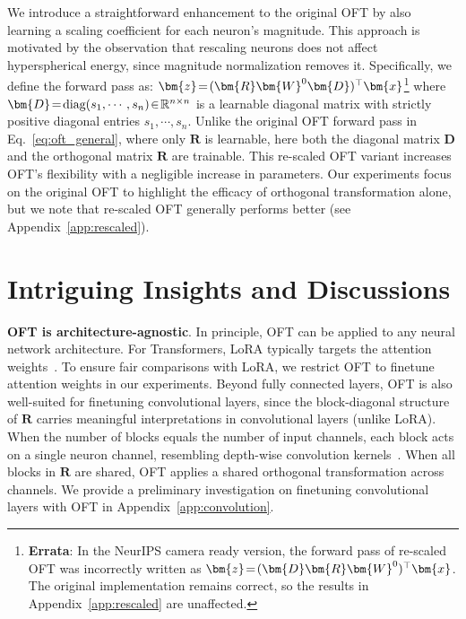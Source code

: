 We introduce a straightforward enhancement to the original OFT by also learning a scaling coefficient for each neuron’s magnitude. This approach is motivated by the observation that rescaling neurons does not affect hyperspherical energy, since magnitude normalization removes it. Specifically, we define the forward pass as: $\thickmuskip=2mu \medmuskip=2mu\bm{z}=(\bm{R}\bm{W}^0\bm{D})^\top\bm{x}$\footnote{\textbf{Errata}: In the NeurIPS camera ready version, the forward pass of re-scaled OFT was incorrectly written as $\thickmuskip=2mu \medmuskip=2mu\bm{z}=(\bm{D}\bm{R}\bm{W}^0)^\top\bm{x}$. The original implementation remains correct, so the results in Appendix~\ref{app:rescaled} are unaffected.} where $\thickmuskip=2mu \medmuskip=2mu \bm{D}=\text{diag}(s_1,\cdots,s_n)\in\mathbb{R}^{n\times n}$ is a learnable diagonal matrix with strictly positive diagonal entries $s_1,\cdots,s_n$. Unlike the original OFT forward pass in Eq.~\eqref{eq:oft_general}, where only $\bm{R}$ is learnable, here both the diagonal matrix $\bm{D}$ and the orthogonal matrix $\bm{R}$ are trainable. This re-scaled OFT variant increases OFT’s flexibility with a negligible increase in parameters. Our experiments focus on the original OFT to highlight the efficacy of orthogonal transformation alone, but we note that re-scaled OFT generally performs better (see Appendix~\ref{app:rescaled}).

\section{Intriguing Insights and Discussions}

\textbf{OFT is architecture-agnostic}. In principle, OFT can be applied to any neural network architecture. For Transformers, LoRA typically targets the attention weights~\cite{hulora2022}. To ensure fair comparisons with LoRA, we restrict OFT to finetune attention weights in our experiments. Beyond fully connected layers, OFT is also well-suited for finetuning convolutional layers, since the block-diagonal structure of $\bm{R}$ carries meaningful interpretations in convolutional layers (unlike LoRA). When the number of blocks equals the number of input channels, each block acts on a single neuron channel, resembling depth-wise convolution kernels~\cite{chollet2017xception}. When all blocks in $\bm{R}$ are shared, OFT applies a shared orthogonal transformation across channels. We provide a preliminary investigation on finetuning convolutional layers with OFT in Appendix~\ref{app:convolution}.

